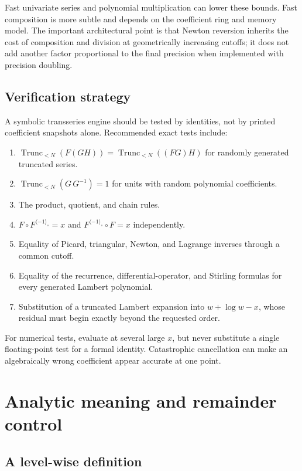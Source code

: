 \documentclass[11pt,oneside]{article}
\numberwithin{equation}{section}
\theoremstyle{definition}
\newcommand{\rev}{\langle-1\rangle_{\circ}}
\newcommand{\TransseriesTruncateBelow}[2]{%
  \operatorname{Trunc}_{<#2}\!\left(#1\right)%
}
\begin{document}
Fast univariate series and polynomial multiplication can lower these bounds.
Fast composition is more subtle and depends on the coefficient ring and memory
model.  The important architectural point is that Newton reversion inherits the
cost of composition and division at geometrically increasing cutoffs; it does
not add another factor proportional to the final precision when implemented
with precision doubling.

\subsection{Verification strategy}

A symbolic transseries engine should be tested by identities, not by printed
coefficient snapshots alone.  Recommended exact tests include:
\begin{enumerate}
\item \(\TransseriesTruncateBelow{F(GH)}{N}
  =\TransseriesTruncateBelow{(FG)H}{N}\) for randomly generated truncated
  series.
\item \(\TransseriesTruncateBelow{G\,G^{-1}}{N}=1\) for units with random
  polynomial coefficients.
\item The product, quotient, and chain rules.
\item \(F\circ F^{\rev}=x\) and \(F^{\rev}\circ F=x\) independently.
\item Equality of Picard, triangular, Newton, and Lagrange inverses through a
  common cutoff.
\item Equality of the recurrence, differential-operator, and Stirling formulas
  for every generated Lambert polynomial.
\item Substitution of a truncated Lambert expansion into
  \(w+\log w-x\), whose residual must begin exactly beyond the requested order.
\end{enumerate}

For numerical tests, evaluate at several large \(x\), but never substitute a
single floating-point test for a formal identity.  Catastrophic cancellation can
make an algebraically wrong coefficient appear accurate at one point.

\section{Analytic meaning and remainder control}\label{sec:analytic-meaning}

\subsection{A level-wise definition}
\end{document}
